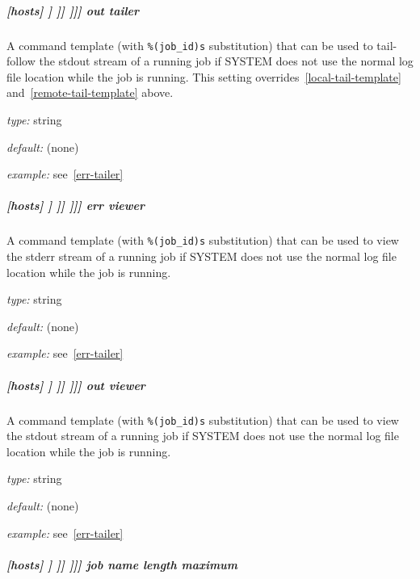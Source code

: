 \subparagraph[{[[[[}SYSTEM{]]]]}out tailer]{[hosts] \textrightarrow [[HOST]] \textrightarrow [[[batch systems]]] \textrightarrow [[[[SYSTEM]]]] \textrightarrow out tailer}
\label{out-tailer}

A command template (with \lstinline=%(job_id)s= substitution) that can be used
to tail-follow the stdout stream of a running job if SYSTEM does
not use the normal log file location while the job is running.  This setting
overrides~\ref{local-tail-template} and~\ref{remote-tail-template} above.

\begin{myitemize}
\item {\em type:} string
\item {\em default:} (none)
\item {\em example:} see~\ref{err-tailer}
\end{myitemize}

\subparagraph[{[[[[}SYSTEM{]]]]}err viewer]{[hosts] \textrightarrow [[HOST]] \textrightarrow [[[batch systems]]] \textrightarrow [[[[SYSTEM]]]] \textrightarrow err viewer}

A command template (with \lstinline=%(job_id)s= substitution) that can be used
to view the stderr stream of a running job if SYSTEM does
not use the normal log file location while the job is running.

\begin{myitemize}
\item {\em type:} string
\item {\em default:} (none)
\item {\em example:} see~\ref{err-tailer}
\end{myitemize}

\subparagraph[{[[[[}SYSTEM{]]]]}out viewer]{[hosts] \textrightarrow [[HOST]] \textrightarrow [[[batch systems]]] \textrightarrow [[[[SYSTEM]]]] \textrightarrow out viewer}

A command template (with \lstinline=%(job_id)s= substitution) that can be used
to view the stdout stream of a running job if SYSTEM does
not use the normal log file location while the job is running.

\begin{myitemize}
\item {\em type:} string
\item {\em default:} (none)
\item {\em example:} see~\ref{err-tailer}
\end{myitemize}

\subparagraph[{[[[[}SYSTEM{]]]]}job name length maximum]{[hosts] \textrightarrow [[HOST]] \textrightarrow [[[batch systems]]] \textrightarrow [[[[SYSTEM]]]] \textrightarrow job name length maximum}
\label{JobNameLengthMaximum}

